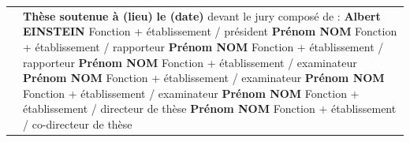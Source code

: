 \documentclass[10pt]{book}
\begin{document}
\begin{titlepage}
\begin{center}
\begin{minipage}{\glarg}
\begin{tabular}{p{7cm}p{10cm}}
\begin{minipage}{\plarg}
\hspace{-1.8cm}{\huge\bf Intelligent Automotive}\vspace{5mm}

\hspace{-1.8cm}{\huge\bf Systems}\vspace{5mm}

\end{minipage}
&
\begin{minipage}{\plarg}
{\large\bf Th\`ese soutenue \`a (lieu)\vspace{1mm}\newline}
{\large\bf le (date)\vspace{2mm}\newline}
{\large devant le jury compos\'e de : \vspace{2mm}\newline}
{\Large\bf Albert EINSTEIN\vspace{0mm}\newline}
{ Fonction + \'etablissement \!/\! pr\'esident\vspace{1mm}\newline}
{\Large\bf Pr\'enom NOM\vspace{0mm}\newline}
{ Fonction + \'etablissement \!/\! rapporteur\vspace{1mm}\newline}
{\Large\bf Pr\'enom NOM\vspace{0mm}\newline}
{ Fonction + \'etablissement \!/\! rapporteur\vspace{1mm}\newline}
{\Large\bf Pr\'enom NOM\vspace{0mm}\newline}
{ Fonction + \'etablissement \!/\! examinateur\vspace{1mm}\newline}
{\Large\bf Pr\'enom NOM\vspace{0mm}\newline}
{ Fonction + \'etablissement \!/\! examinateur\vspace{1mm}\newline}
{\Large\bf Pr\'enom NOM\vspace{0mm}\newline}
{ Fonction + \'etablissement \!/\! examinateur\vspace{1mm}\newline}
{\Large\bf Pr\'enom NOM\vspace{0mm}\newline}
{ Fonction + \'etablissement \!/\! directeur de th\`ese\vspace{1mm}\newline}
{\Large\bf Pr\'enom NOM\vspace{0mm}\newline}
{ Fonction + \'etablissement \!/\! co-directeur de th\`ese}


\end{minipage}
\end{tabular}
\end{minipage}
\end{center}
\end{titlepage}
\end{document}
